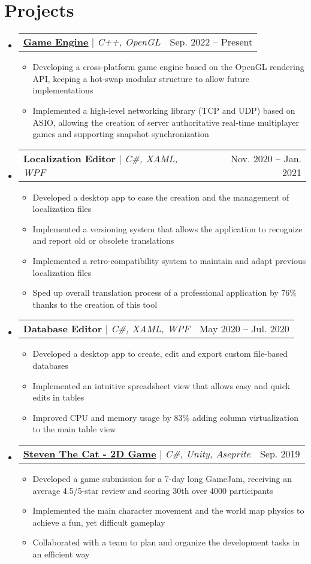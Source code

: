 \documentclass[letterpaper,11pt]{article}
\makeatletter
\newcommand{\resumeItem}[1]{
  \item\small{
    {#1 \vspace{-2pt}}
  }
}
\newcommand{\resumeProjectHeading}[2]{
    \item
    \begin{tabular*}{0.97\textwidth}{l@{\extracolsep{\fill}}r}
      \small#1 & #2 \\
    \end{tabular*}\vspace{-7pt}
}
\newcommand{\resumeSubHeadingListStart}{\begin{itemize}[leftmargin=0.15in, label={}]}
\newcommand{\resumeSubHeadingListEnd}{\end{itemize}}
\newcommand{\resumeItemListStart}{\begin{itemize}}
\newcommand{\resumeItemListEnd}{\end{itemize}\vspace{-5pt}}
\makeatother
\begin{document}
\section{Projects}
    \resumeSubHeadingListStart
      \resumeProjectHeading
          {\textbf{{\href{https://github.com/Penca53/aubengine}{\underline{Game Engine}}}} $|$ \emph{C++, OpenGL}}{Sep. 2022 -- Present}
          \resumeItemListStart
            \resumeItem{Developing a cross-platform game engine based on the OpenGL rendering API, keeping a hot-swap modular structure to allow future implementations}
            \resumeItem{Implemented a high-level networking library (TCP and UDP) based on ASIO, allowing the creation of server authoritative real-time multiplayer games and supporting snapshot synchronization}
          \resumeItemListEnd
      \resumeProjectHeading
          {\textbf{Localization Editor} $|$ \emph{C\#, XAML, WPF}}{Nov. 2020 -- Jan. 2021}
          \resumeItemListStart
            \resumeItem{Developed a desktop app to ease the creation and the management of localization files}
            \resumeItem{Implemented a versioning system that allows the application to recognize and report old or obsolete translations}
            \resumeItem{Implemented a retro-compatibility system to maintain and adapt previous localization files}
            \resumeItem{Sped up overall translation process of a professional application by 76\% thanks to the creation of this tool}
          \resumeItemListEnd
      \resumeProjectHeading
          {\textbf{Database Editor} $|$ \emph{C\#, XAML, WPF}}{May 2020 -- Jul. 2020}
          \resumeItemListStart
            \resumeItem{Developed a desktop app to create, edit and export custom file-based databases}
            \resumeItem{Implemented an intuitive spreadsheet view that allows easy and quick edits in tables}
            \resumeItem{Improved CPU and memory usage by 83\% adding column virtualization to the main table view}
          \resumeItemListEnd
      \resumeProjectHeading
          {{\textbf{{\href{https://konstantin890.itch.io/steven-the-cat}{\underline{Steven The Cat - 2D Game}}}} $|$ \emph{C\#, Unity, Aseprite}}}{Sep. 2019}
          \resumeItemListStart
            \resumeItem{Developed a game submission for a 7-day long GameJam, receiving an average 4.5/5-star review \newline
            and scoring 30th over 4000 participants}
            \resumeItem{Implemented the main character movement and the world map physics to achieve a fun, yet difficult gameplay}
            \resumeItem{Collaborated with a team to plan and organize the development tasks in an efficient way}
          \resumeItemListEnd
    \resumeSubHeadingListEnd
\end{document}

